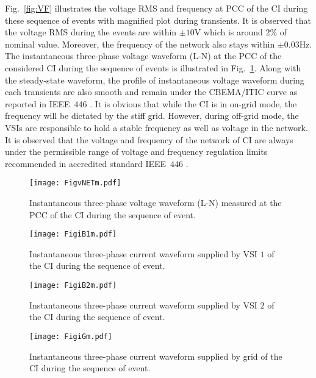 \documentclass[journal]{IEEEtran}
\begin{document}
\par Fig.~\ref{fig:VF} illustrates the voltage RMS and frequency at PCC of the CI during these sequence of events with magnified plot during transients. It is observed that the voltage RMS during the events are within $\pm 10$V which is around $2\%$ of nominal value. Moreover, the frequency of the network also stays within $\pm 0.03$Hz. The instantaneous three-phase voltage waveform (L-N) at the PCC of the considered CI during the sequence of events is illustrated in Fig.~\ref{fig:vNET}. Along with the steady-state waveform, the profile of instantaneous voltage waveform during each transients are also smooth and remain under the CBEMA/ITIC curve as reported in IEEE~$446$ \cite{ieee446}. It is obvious that while the CI is in on-grid mode, the frequency will be dictated by the stiff grid. However, during off-grid mode, the VSIs are responsible to hold a stable frequency as well as voltage in the network. It is observed that the voltage and frequency of the network of CI are always under the permissible range of voltage and frequency regulation limits recommended in accredited standard IEEE~$446$ \cite{ieee446}. 
\begin{figure}[t]
	\centering
    \texttt{[image: FigvNETm.pdf]}%
	\caption{Instantaneous three-phase voltage waveform (L-N) measured at the PCC of the CI during the sequence of event.}
	\label{fig:vNET}
\end{figure}
\begin{figure}[t]
	\centering
    \texttt{[image: FigiB1m.pdf]}%
	\caption{Instantaneous three-phase current waveform supplied by VSI $1$ of the CI during the sequence of event.}
	\label{fig:iB1}
\end{figure}
\begin{figure}[t]
	\centering
    \texttt{[image: FigiB2m.pdf]}%
	\caption{Instantaneous three-phase current waveform supplied by VSI $2$ of the CI during the sequence of event.}
	\label{fig:iB2}
\end{figure}
\begin{figure}[t]
	\centering
    \texttt{[image: FigiGm.pdf]}%
	\caption{Instantaneous three-phase current waveform supplied by grid of the CI during the sequence of event.}
	\label{fig:iG}
\end{figure}
\end{document}
